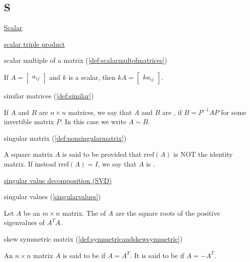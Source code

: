\documentclass{ximera}
\begin{document}
\subsection*{S}
\href{https://ximera.osu.edu/linearalgebradzv3/LinearAlgebraInteractiveIntro/VEC-0010/main}{Scalar}

\href{https://ximera.osu.edu/linearalgebradzv3/LinearAlgebraInteractiveIntro/DET-0070/main}{scalar triple product}

scalar multiple of a matrix
(\ref{def:scalarmultofmatrices})
\begin{expandable}{}{}
    If $A=\begin{bmatrix} a_{ij}\end{bmatrix} $ and $k$ is a scalar,
then $kA=\begin{bmatrix} ka_{ij}\end{bmatrix}$. 
\end{expandable}

similar matrices (\ref{def:similar})
\begin{expandable}{}{}
    If $A$ and $B$ are $n \times n$ matrices, we say that $A$ and $B$ are , if $B = P^{-1}AP$ for some invertible matrix $P$.  In this case we write $A \sim B$.
\end{expandable}

singular matrix (\ref{def:nonsingularmatrix})
\begin{expandable}{}{}
    A square matrix $A$ is said to be  provided that $\mbox{rref}(A)$ is NOT the identity matrix.  If instead $\mbox{rref}(A)=I$, we say that $A$ is .
\end{expandable}

\href{https://ximera.osu.edu/linearalgebradzv3/LinearAlgebraInteractiveIntro/RTH-0060/main}{singular value decomposition (SVD)}

singular values (\ref{singularvalues})
\begin{expandable}{}{}
    Let $A$ be an $m\times n$ matrix. The  of $A$ are the square roots of the positive
eigenvalues of $A^TA.$ 
\end{expandable}

skew symmetric matrix (\ref{def:symmetricandskewsymmetric})
\begin{expandable}{}{}
    An $n\times n$ matrix $A$ is said to be
 if $A=A^{T}.$ It is said to be
 if $A=-A^{T}.$
\end{expandable}

\end{document}
